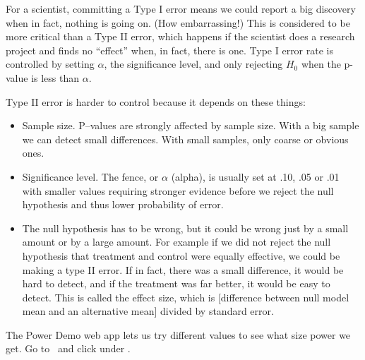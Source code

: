For a scientist, committing a Type I error means we could report a
big discovery when in fact, nothing is going on. (How embarrassing!)
This is considered to be more critical than a Type II error, which happens if
the scientist does a research project and finds no ``effect'' when, in
fact, there is one. Type I error rate is controlled by setting
$\alpha$, the significance level, and only rejecting $H_0$ when the
p-value is less than $\alpha$. 


Type II error is harder to control because it depends on these things:
\vspace{-.2cm}
\begin{itemize}
\item  Sample size.  P--values are strongly affected by sample
  size. With a big sample we can detect small differences.  With small
  samples, only coarse or obvious ones.
\item  Significance level.  The fence, or $\alpha$ (alpha), is
  usually set at .10, .05 or .01 with smaller values requiring
  stronger evidence before we reject the null hypothesis and thus
  lower probability of error.  
\item  The null hypothesis has to be wrong, but it could be wrong just
  by a small amount or by a large amount.  For example if 
   we did not reject the null hypothesis that treatment and
  control  were equally effective,  we could be making a type II
  error.  If in fact,  there was a small difference, it would be
  hard to detect, and if the treatment was far better, it would
  be easy to detect.  This is called the effect size, which is
  [difference between null model mean and an alternative mean] divided
  by standard error.
\end{itemize}


The Power Demo web app lets us try different values to see what size
power we get.  Go to 
\webAppURLFrst\  and click
 under .

